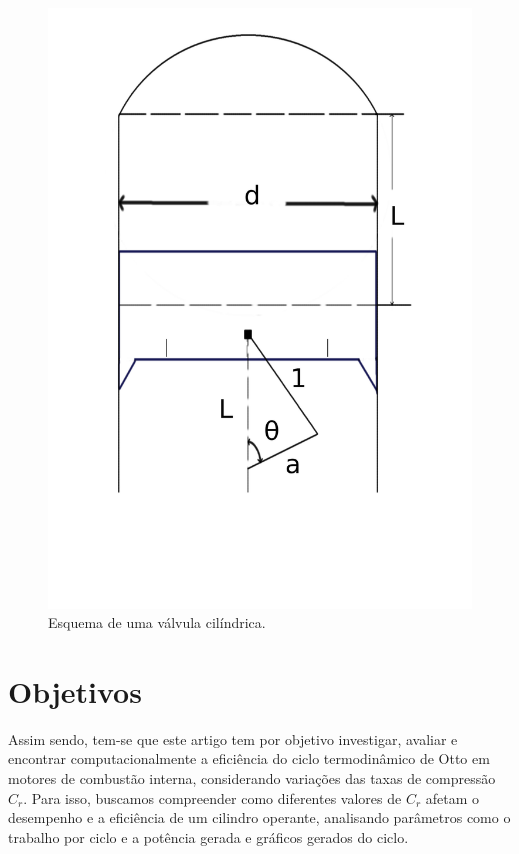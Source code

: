 \documentclass[10pt, conference, letterpaper]{IEEEtran}
\begin{document}
\begin{figure}[H]
    \centering
    \includegraphics[width=\columnwidth]{Imagens/cilindro1.jpg}
    \caption{Esquema de uma válvula cilíndrica.}
    \label{fig:imagem-do-cilindro}
\end{figure}

\section{Objetivos}
Assim sendo, tem-se que este artigo tem por objetivo investigar, avaliar e encontrar computacionalmente a eficiência do ciclo termodinâmico de Otto em motores de combustão interna, considerando variações das taxas de compressão $C_r$. Para isso, buscamos compreender como diferentes valores de $C_r$ afetam o desempenho e a eficiência de um cilindro operante, analisando parâmetros como o trabalho por ciclo e a potência gerada e gráficos gerados do ciclo. \newline
\end{document}
